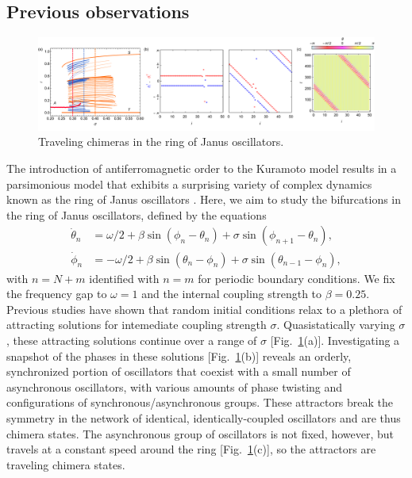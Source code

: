 \documentclass[aps,pre,amsmath,amssymb,floatfix,onecolumn,notitlepage,10pt]{revtex4-1}
\begin{document}
\subsection{Previous observations}
\begin{figure}[hbt]
\includegraphics[width=\columnwidth]{janus}
\caption{Traveling chimeras in the ring of Janus oscillators. \label{fig3}}
\end{figure}
The introduction of antiferromagnetic order to the Kuramoto model results in a parsimonious model that exhibits a surprising variety of complex dynamics known as the ring of Janus oscillators \cite{2019_Nicolaou}.  Here, we aim to study the bifurcations in the ring of Janus oscillators, defined by the equations
\begin{align}
\dot{\theta}_n &= \omega/2 + \beta\sin(\phi_n - \theta_n) + \sigma \sin(\phi_{n+1}-\theta_n), \label{janus1}\\
\dot{\phi}_n &= -\omega/2 + \beta\sin(\theta_n - \phi_n) + \sigma \sin(\theta_{n-1}-\phi_n), \label{janus2}
\end{align}
with $n=N+m$ identified with $n=m$ for periodic boundary conditions. We fix the frequency gap to $\omega=1$ and the internal coupling strength to $\beta=0.25$. Previous studies have shown that random initial conditions relax to a plethora of attracting solutions for intemediate coupling strength $\sigma$. Quasistatically varying $\sigma$, these attracting solutions continue over a range of $\sigma$ [Fig.~\ref{fig3}(a)]. Investigating  a snapshot of the phases in these solutions [Fig.~\ref{fig3}(b)] reveals an orderly, synchronized portion of oscillators that coexist with a small number of asynchronous oscillators, with various amounts of phase twisting and configurations of synchronous/asynchronous groups.  These attractors break the symmetry in the network of identical, identically-coupled oscillators and are thus chimera states.   The asynchronous group of oscillators is not fixed, however, but travels at a constant speed around the ring [Fig.~\ref{fig3}(c)], so the attractors are traveling chimera states. 
\end{document}
